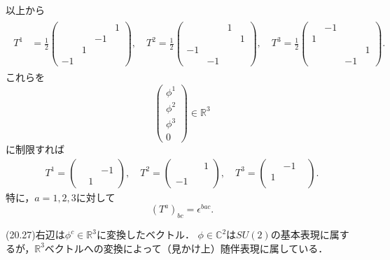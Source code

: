 以上から
\begin{align}
  \begin{split}
    T^1 &= \frac{1}{2}
    \begin{pmatrix}
      & & & 1 \\ & & -1 & \\ & 1 & & \\ -1 & & &
    \end{pmatrix}
    , \quad
    T^2 = \frac{1}{2}
    \begin{pmatrix}
      & & 1 & \\ & & & 1 \\ -1 & & & \\ & -1 & &
    \end{pmatrix}
    , \quad
    T^3 = \frac{1}{2}
    \begin{pmatrix}
      & -1 & & \\ 1 & & & \\ & & & 1 \\ & & -1 &
    \end{pmatrix}
    .
  \end{split}
  \label{20_27_TR4}
\end{align}
これらを
\[
\begin{pmatrix}
  \phi^1 \\ \phi^2 \\ \phi^3 \\ 0
\end{pmatrix}
\in \mathbb{R}^3
\]
に制限すれば
\begin{align}
  T^1 =
  \begin{pmatrix}
    & & \\ & & -1 \\ & 1 &
  \end{pmatrix}
  , \quad
  T^2 =
  \begin{pmatrix}
    & & 1\\ & &  \\ -1 & &
  \end{pmatrix}
  , \quad
  T^3 =
  \begin{pmatrix}
    & -1 & \\ 1 & & \\ & &
  \end{pmatrix}
  .
\label{20_27_TR3}
\end{align}
特に，\(a=1, 2, 3\)に対して
\[ (T^a)_{bc} = \epsilon^{bac} .  \]

(20.27)右辺は\(\phi^c \in \mathbb{R}^3\)に変換したベクトル．
\(\phi \in \mathbb{C}^2\)は\(SU(2)\)の基本表現に属するが，\(\mathbb{R}^3\)ベクトルへの変換によって（見かけ上）随伴表現に属している．

